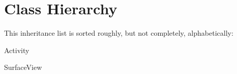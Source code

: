 \section{Class Hierarchy}
This inheritance list is sorted roughly, but not completely, alphabetically\+:\begin{DoxyCompactList}
\item {}
\item Activity\begin{DoxyCompactList}
\item {}
\item {}
\end{DoxyCompactList}
\item Surface\+View\begin{DoxyCompactList}
\item {}
\end{DoxyCompactList}
\end{DoxyCompactList}
